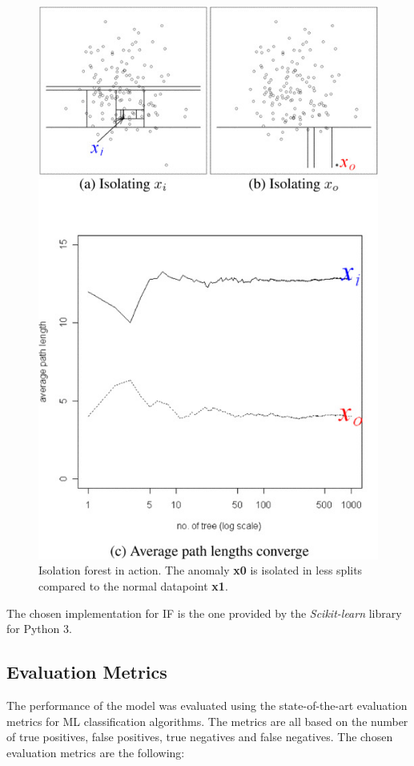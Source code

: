 \documentclass[futureinternet,article,submit,pdftex,moreauthors]{Definitions/mdpi}
\begin{document}
\begin{figure}[H]
	\includegraphics[width=6 cm]{img/IsolationForest.jpg}
	\caption{Isolation forest in action. The anomaly \textbf{x0} is isolated in less splits compared to the normal datapoint \textbf{x1}\cite{IsolationForestLiu}.}
	\label{fig:IsolationForest}
\end{figure}   
\unskip

The chosen implementation for IF is the one provided by the \textit{Scikit-learn} library \cite{IsolationForestScikitLearn} for Python 3. 

\subsection{Evaluation Metrics}\label{EvaluationMetrics}

The performance of the model was evaluated using the state-of-the-art evaluation metrics for ML classification algorithms. The metrics are all based on the number of true positives, false positives, true negatives and false negatives.
The chosen evaluation metrics are the following: 
\end{document}
